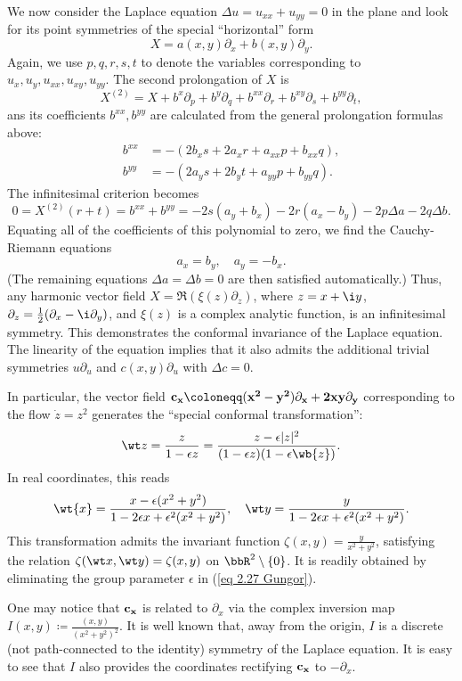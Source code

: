 \begin{example}
    We now consider the Laplace equation $\Delta u=u_{xx}+u_{yy}=0$ in the plane and look for its point symmetries of the special ``horizontal'' form 
    \[X=a(x,y)\partial_x+b(x,y)\partial_y.\]
    Again, we use $p,q,r,s,t$ to denote the variables corresponding to $u_x,u_y,u_{xx},u_{xy},u_{yy}$. The second prolongation of $X$ is 
    \[X^{(2)}=X+b^x\partial_{p}+b^y\partial_q+b^{xx}\partial_r+b^{xy}\partial_s+b^{yy}\partial_t,\]
    ans its coefficients $b^{xx},b^{yy}$ are calculated from the general prolongation formulas above:
    \begin{align}
        b^{xx}&=-(2b_x s+2a_x r+a_{xx}p+b_{xx}q),\\
        b^{yy}&=-(2a_y s+2b_y t+a_{yy}p+b_{yy}q).
    \end{align}
    The infinitesimal criterion becomes 
    \[0=X^{(2)}(r+t)=b^{xx}+b^{yy}=-2s(a_y+b_x)-2r(a_x-b_y)-2p\Delta a-2q\Delta b.\]
    Equating all of the coefficients of this polynomial to zero, we find the Cauchy-Riemann equations 
    \[a_x=b_y,\quad a_y=-b_x.\]
    (The remaining equations $\Delta a=\Delta b=0$ are then satisfied automatically.) Thus, any harmonic vector field $X=\Re(\xi(z)\partial_z)$, where $z=x+\i y$, $\partial_z=\frac12(\partial_x-\i \partial_y)$, and $\xi(z)$ is a complex analytic function, is an infinitesimal symmetry. This demonstrates the conformal invariance of the Laplace equation. The linearity of the equation implies that it also admits the additional trivial symmetries $u\partial_u$ and $c(x,y)\partial_u$ with $\Delta c=0$.

    In particular, the vector field $\bf{c}_x\coloneqq (x^2-y^2)\partial_x+2xy\partial_y$ corresponding to the flow $\dot z=z^2$ generates the ``special conformal transformation'':
    \[\wt z=\frac{z}{1-\epsilon z}=\frac{z-\epsilon |z|^2}{(1-\epsilon z)(1-\epsilon \wb{z})}.\]
    In real coordinates, this reads 
    \[\wt{x}=\frac{x-\epsilon(x^2+y^2)}{1-2\epsilon x+\epsilon^2(x^2+y^2)},\quad \wt y=\frac{y}{1-2\epsilon x+\epsilon^2(x^2+y^2)}.\label{eq 2.27 Gungor}\]
    This transformation admits the invariant function $\zeta(x,y)=\frac{y}{x^2+y^2}$, satisfying the relation $\zeta(\wt x,\wt y)=\zeta(x,y)$ on $\bbR^2\setminus\{0\}$. It is readily obtained by eliminating the group parameter $\epsilon$ in (\ref{eq 2.27 Gungor}).

    One may notice that $\bf{c}_x$ is related to $\partial_x$ via the complex inversion map $I(x,y)\coloneqq \frac{(x,y)}{(x^2+y^2)^2}$. It is well known that, away from the origin, $I$ is a discrete (not path-connected to the identity) symmetry of the Laplace equation. It is easy to see that $I$ also provides the coordinates rectifying $\bf{c}_x$ to $-\partial_x$.


\end{example}
